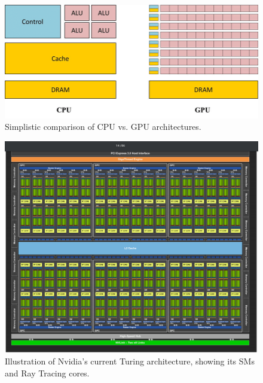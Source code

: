 \begin{figure}
	\centering
	\includegraphics[width = 0.8\linewidth]{Figures/cpuvsgpu}
	\caption{Simplistic comparison of CPU vs. GPU architectures.}
	\label{fig:cpugpu}
\end{figure}
\begin{figure}
	\centering
	\includegraphics[width =0.65\linewidth]{Figures/turing}
	\caption{Illustration of Nvidia's current Turing architecture, showing its SMs and Ray Tracing cores.}
	\label{fig:turing}
\end{figure}

